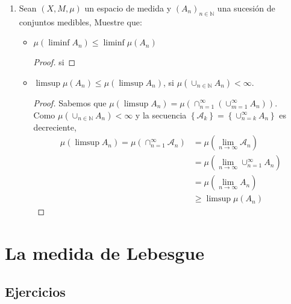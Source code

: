 \documentclass[spanish,12pt,a4paper,openany]{book}
\begin{document}
\begin{enumerate}
		$\limsup A_{n} = \cap_{n=1} ^{\infty} A_{n}= \liminf A_{n} $.
		
		\begin{proof}
			La prueba es análoga a la del punto anterior y se deja como ejercicio al lector.
		\end{proof}
		
		\item Sean $(X,M, \mu)$ un espacio de medida y $(A_{n})_{n \in \mathbb{N}}$ una sucesión de conjuntos medibles, Muestre que:\\
		
			\begin{itemize}
				\item  $\mu (\liminf A_{n}) \leq \liminf \mu (A_{n}) $
				
				\begin{proof}
					si 
				\end{proof}
				
				\item  $\limsup \mu(A_{n}) \leq \mu (\limsup A_{n}) $, si $\mu(\cup_{n \in \mathbb{N}} A_{n} ) < \infty$.
					 
				\begin{proof}
					Sabemos que $\mu( \limsup A_{n} ) = \mu (\cap_{n=1} ^{\infty} (\cup_{m=1} ^{\infty} A_{n}))$.\\
					Como $\mu(\cup_{n \in \mathbb{N}} A_{n} ) < \infty$ y la secuencia $\left\{ \mathcal{A}_{k} \right\} = \left\{\cup_{n=k} ^{\infty} A_{n} \right\}$ es decreciente,\\
					\begin{align*}
						\mu (\limsup A_{n}) = \mu (\cap_{n=1} ^ {\infty} \mathcal{A}_{n}) &= \mu(\lim_{n \rightarrow \infty} \mathcal{A}_{n})\\
						 				 &= \mu ( \lim_{n \rightarrow \infty} \cup_{n=1} ^{\infty} A_{n})\\
						 				 &= \mu(\lim_{n \rightarrow \infty} A_{n})\\
						 				 &\geq \limsup \mu (A_{n})
					\end{align*}
					
				\end{proof}
			\end{itemize}
			
	\end{enumerate}
	\chapter{La medida de Lebesgue}
	\section{Ejercicios}
\end{document}

